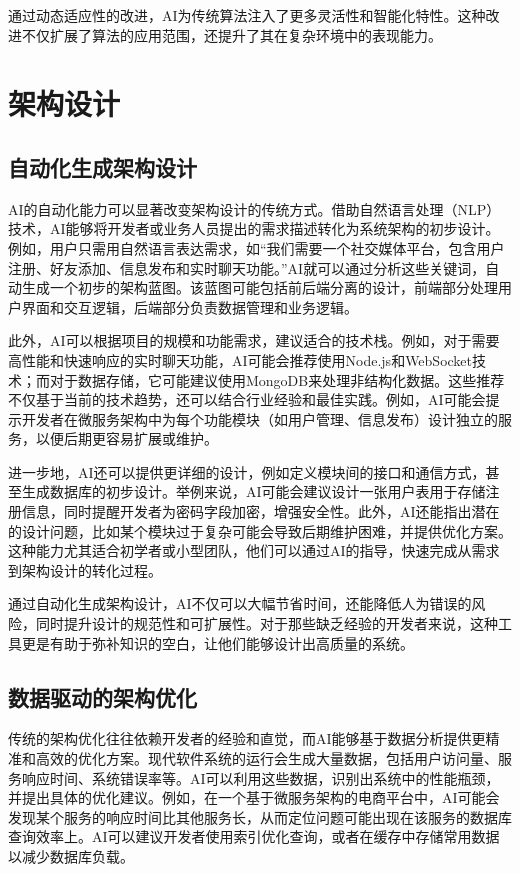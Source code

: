 \documentclass[supercite]{HustGraduPaper}
\begin{document}
通过动态适应性的改进，AI为传统算法注入了更多灵活性和智能化特性。这种改进不仅扩展了算法的应用范围，还提升了其在复杂环境中的表现能力。

	\section{架构设计}
	\subsection{自动化生成架构设计}
 AI的自动化能力可以显著改变架构设计的传统方式。借助自然语言处理（NLP）技术，AI能够将开发者或业务人员提出的需求描述转化为系统架构的初步设计。例如，用户只需用自然语言表达需求，如“我们需要一个社交媒体平台，包含用户注册、好友添加、信息发布和实时聊天功能。”AI就可以通过分析这些关键词，自动生成一个初步的架构蓝图。该蓝图可能包括前后端分离的设计，前端部分处理用户界面和交互逻辑，后端部分负责数据管理和业务逻辑。

此外，AI可以根据项目的规模和功能需求，建议适合的技术栈。例如，对于需要高性能和快速响应的实时聊天功能，AI可能会推荐使用Node.js和WebSocket技术；而对于数据存储，它可能建议使用MongoDB来处理非结构化数据。这些推荐不仅基于当前的技术趋势，还可以结合行业经验和最佳实践。例如，AI可能会提示开发者在微服务架构中为每个功能模块（如用户管理、信息发布）设计独立的服务，以便后期更容易扩展或维护。

进一步地，AI还可以提供更详细的设计，例如定义模块间的接口和通信方式，甚至生成数据库的初步设计。举例来说，AI可能会建议设计一张用户表用于存储注册信息，同时提醒开发者为密码字段加密，增强安全性。此外，AI还能指出潜在的设计问题，比如某个模块过于复杂可能会导致后期维护困难，并提供优化方案。这种能力尤其适合初学者或小型团队，他们可以通过AI的指导，快速完成从需求到架构设计的转化过程。

通过自动化生成架构设计，AI不仅可以大幅节省时间，还能降低人为错误的风险，同时提升设计的规范性和可扩展性。对于那些缺乏经验的开发者来说，这种工具更是有助于弥补知识的空白，让他们能够设计出高质量的系统。
     \subsection{数据驱动的架构优化}
传统的架构优化往往依赖开发者的经验和直觉，而AI能够基于数据分析提供更精准和高效的优化方案。现代软件系统的运行会生成大量数据，包括用户访问量、服务响应时间、系统错误率等。AI可以利用这些数据，识别出系统中的性能瓶颈，并提出具体的优化建议。例如，在一个基于微服务架构的电商平台中，AI可能会发现某个服务的响应时间比其他服务长，从而定位问题可能出现在该服务的数据库查询效率上。AI可以建议开发者使用索引优化查询，或者在缓存中存储常用数据以减少数据库负载。
\end{document}
